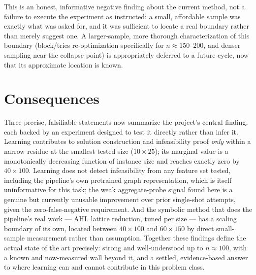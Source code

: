 \documentclass[12pt]{article}
\begin{document}
This is an honest, informative negative finding about the current method, not a failure to execute the experiment as instructed: a small, affordable sample was exactly what was asked for, and it was sufficient to locate a real boundary rather than merely suggest one. A larger-sample, more thorough characterization of this boundary (block/tries re-optimization specifically for $n\approx150$--$200$, and denser sampling near the collapse point) is appropriately deferred to a future cycle, now that its approximate location is known.

\section{Consequences}

Three precise, falsifiable statements now summarize the project's central finding, each backed by an experiment designed to test it directly rather than infer it. Learning contributes to solution construction and infeasibility proof \emph{only} within a narrow residue at the smallest tested size ($10\times25$); its marginal value is a monotonically decreasing function of instance size and reaches exactly zero by $40\times100$. Learning does not detect infeasibility from any feature set tested, including the pipeline's own pretrained graph representation, which is itself uninformative for this task; the weak aggregate-probe signal found here is a genuine but currently unusable improvement over prior single-shot attempts, given the zero-false-negative requirement. And the symbolic method that does the pipeline's real work --- AHL lattice reduction, tuned per size --- has a scaling boundary of its own, located between $40\times100$ and $60\times150$ by direct small-sample measurement rather than assumption. Together these findings define the actual state of the art precisely: strong and well-understood up to $n\approx100$, with a known and now-measured wall beyond it, and a settled, evidence-based answer to where learning can and cannot contribute in this problem class.
\end{document}
